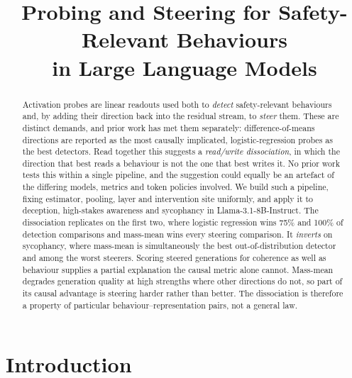 \documentclass[conference]{IEEEtran}
\begin{document}
\title{Probing and Steering for Safety-Relevant Behaviours\\
in Large Language Models}

\author{
}

\maketitle

\begin{abstract}
Activation probes are linear readouts used both to \emph{detect} safety-relevant
behaviours and, by adding their direction back into the residual stream, to
\emph{steer} them. These are distinct demands, and prior work has met them
separately: difference-of-means directions are reported as the most causally
implicated, logistic-regression probes as the best detectors. Read together this
suggests a \emph{read/write dissociation}, in which the direction that best reads
a behaviour is not the one that best writes it. No prior work tests this
within a single pipeline, and the suggestion could equally be an artefact of the
differing models, metrics and token policies involved. We build such a pipeline,
fixing estimator, pooling, layer and intervention site uniformly, and apply it to
deception, high-stakes awareness and sycophancy in Llama-3.1-8B-Instruct. The
dissociation replicates on the first two, where logistic regression wins 75\% and
100\% of detection comparisons and mass-mean wins every steering comparison. It
\emph{inverts} on sycophancy, where mass-mean is simultaneously the best
out-of-distribution detector and among the worst steerers. Scoring steered
generations for coherence as well as behaviour supplies a partial explanation the
causal metric alone cannot. Mass-mean degrades generation quality at high
strengths where other directions do not, so part of its causal advantage is
steering harder rather than better. The dissociation is therefore a property of
particular behaviour--representation pairs, not a general law.
\end{abstract}

\section{Introduction}
\end{document}

